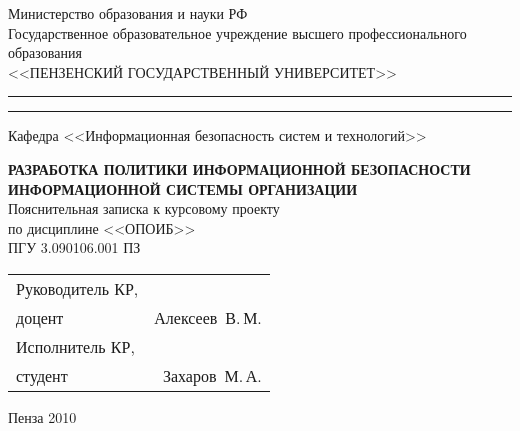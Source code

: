 \newpage
\begin{center}
  \begin{singlespace}
    Министерство образования и науки РФ  \\
    Государственное образовательное учреждение высшего профессионального образования \\
    \vspace{0.25cm}
    <<ПЕНЗЕНСКИЙ ГОСУДАРСТВЕННЫЙ УНИВЕРСИТЕТ>> \\
    \medskip 
    \hrule height 1pt
    \vskip 1pt 
    \hrule
    \vskip 3pt
    Кафедра <<Информационная безопасность систем и технологий>>
  \end{singlespace}

  \vspace{8em}

  \textsc{\textbf{РАЗРАБОТКА ПОЛИТИКИ ИНФОРМАЦИОННОЙ
    БЕЗОПАСНОСТИ ИНФОРМАЦИОННОЙ СИСТЕМЫ ОРГАНИЗАЦИИ}}\\[0.5cm]

  Пояснительная записка к курсовому проекту \\
  по дисциплине <<ОПОИБ>>\\[0.5cm]

  ПГУ 3.090106.001 ПЗ

  \vspace{8em}

  \begin{tabular}[h]{p{7cm}r}
    Руководитель КР,  & \\
    доцент & \underline{\hspace{3cm}}Алексеев~В.\,М.\\
    Исполнитель КР,  & \\
    студент & \underline{\hspace{3cm}}Захаров~М.\,А.
  \end{tabular}

  \vspace{\fill}

  Пенза 2010 

\end{center}
\newpage
